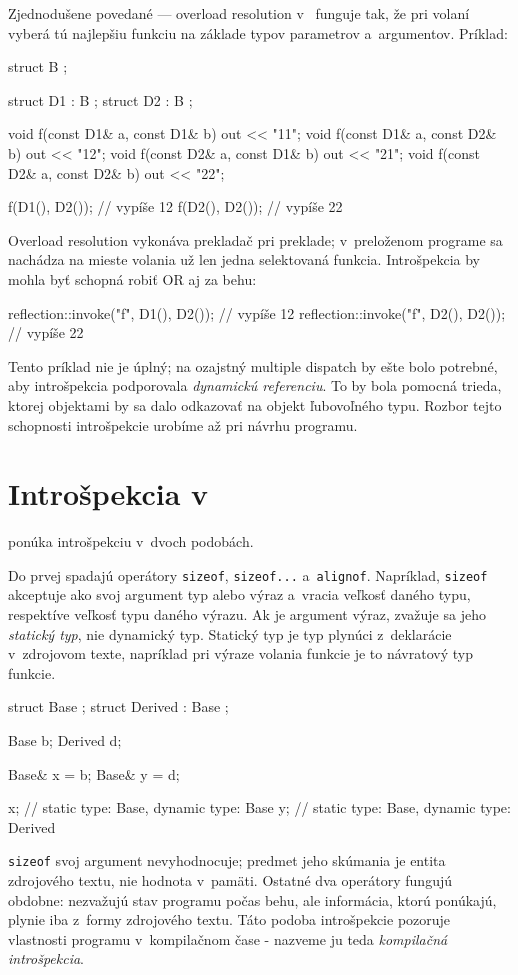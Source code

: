 Zjednodušene povedané --- overload resolution v~\Cpp{} funguje tak, že pri volaní vyberá tú najlepšiu funkciu na základe typov parametrov a~argumentov. Príklad:
\begin{code}
struct B {};

struct D1 : B {};
struct D2 : B {};

void f(const D1& a, const D1& b) { out << "11"; }
void f(const D1& a, const D2& b) { out << "12"; }
void f(const D2& a, const D1& b) { out << "21"; }
void f(const D2& a, const D2& b) { out << "22"; }

f(D1(), D2()); // vypíše 12
f(D2(), D2()); // vypíše 22
\end{code}
Overload resolution vykonáva prekladač pri preklade; v~preloženom programe sa nachádza na mieste volania už len jedna selektovaná funkcia. Introšpekcia by mohla byť schopná robiť OR aj za behu:
\begin{code}
reflection::invoke("f", D1(), D2()); // vypíše 12
reflection::invoke("f", D2(), D2()); // vypíše 22
\end{code}

Tento príklad nie je úplný; na ozajstný multiple dispatch by ešte bolo potrebné, aby introšpekcia podporovala \emph{dynamickú referenciu}. To by bola pomocná trieda, ktorej objektami by sa dalo odkazovať na objekt ľubovoľného typu. Rozbor tejto schopnosti introšpekcie urobíme až pri návrhu programu.

\section{Introšpekcia v~\Cpp{}}

\Cpp{} ponúka introšpekciu v~dvoch podobách.

Do prvej spadajú operátory \texttt{sizeof}, \texttt{sizeof...} a~\texttt{alignof}. Napríklad, \texttt{sizeof} akceptuje ako svoj argument typ alebo výraz a~vracia veľkosť daného typu, respektíve veľkosť typu daného výrazu. Ak je argument výraz, zvažuje sa jeho \emph{statický typ}, nie dynamický typ. Statický typ je typ plynúci z~deklarácie v~zdrojovom texte, napríklad pri výraze volania funkcie je to návratový typ funkcie.
\begin{code}
struct Base {};
struct Derived : Base {};

Base b;
Derived d;

Base& x = b;
Base& y = d;

x; // static type: Base, dynamic type: Base
y; // static type: Base, dynamic type: Derived
\end{code}
\texttt{sizeof} svoj argument nevyhodnocuje; predmet jeho skúmania je entita zdrojového textu, nie hodnota v~pamäti. Ostatné dva operátory fungujú obdobne: nezvažujú stav programu počas behu, ale informácia, ktorú ponúkajú, plynie iba z~formy zdrojového textu. Táto podoba introšpekcie pozoruje vlastnosti programu v~kompilačnom čase - nazveme ju teda \emph{kompilačná introšpekcia}.

